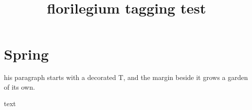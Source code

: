 \documentclass{article}
\title{florilegium tagging test}
\begin{document}
\section{Spring}
his paragraph starts with a decorated T, and the margin beside
it grows a garden of its own.
\florilegiumtextend

\clearpage

text 
\end{document}
